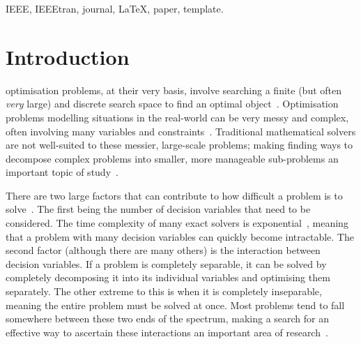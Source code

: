 \documentclass[journal]{IEEEtran}
\begin{document}
\begin{IEEEkeywords}
IEEE, IEEEtran, journal, \LaTeX, paper, template.
\end{IEEEkeywords}






%
\IEEEpeerreviewmaketitle

\section{Introduction}\label{sec:intro}
 optimisation problems, at their very basis, involve searching a finite (but often \emph{very} large) and discrete search space to find an optimal object~\cite{copalg}. 
Optimisation problems modelling situations in the real-world can be very messy and complex, often involving many variables and constraints~\cite{deb_book}. Traditional mathematical solvers are not well-suited to these messier, large-scale problems; making finding ways to decompose complex problems into smaller, more manageable sub-problems an important topic of study~\cite{hybridmeta}.

There are two large factors that can contribute to how difficult a problem is to solve~\cite{int_and_cop}. The first being the number of decision variables that need to be considered. The time complexity of many exact solvers is exponential~\cite{convex}, meaning that a problem with many decision variables can quickly become intractable. 
The second factor (although there are many others) is the interaction between decision variables. If a problem is completely separable, it can be solved by completely decomposing it into its individual variables and optimising them separately. The other extreme to this is when it is completely inseparable, meaning the entire problem must be solved at once. Most problems tend to fall somewhere between these two ends of the spectrum, making a search for an effective way to ascertain these interactions an important area of research~\cite{decomp,omidvar}.
\end{document}
